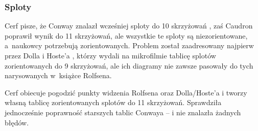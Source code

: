 \subsubsection{Sploty}
Cerf \cite{cerf98} pisze, że Conway znalazł wcześniej sploty do 10 skrzyżowań \cite{conway70}, zaś Caudron \cite{caudron82} poprawił wynik do 11 skrzyżowań, ale wszystkie te sploty są niezorientowane, a~naukowcy potrzebują zorientowanych.
Problem został zaadresowany najpierw przez Dolla i Hoste'a \cite{doll91}, którzy wydali na mikrofilmie tablicę splotów zorientowanych do 9 skrzyżowań, ale ich diagramy nie zawsze pasowały do tych narysowanych w~książce Rolfsena.

Cerf obiecuje pogodzić punkty widzenia Rolfsena oraz Dolla/Hoste'a i tworzy własną tablicę zorientowanych splotów do 11 skrzyżowań.
Sprawdziła jednocześnie poprawność starszych tablic Conwaya -- i nie znalazła żadnych błędów.
